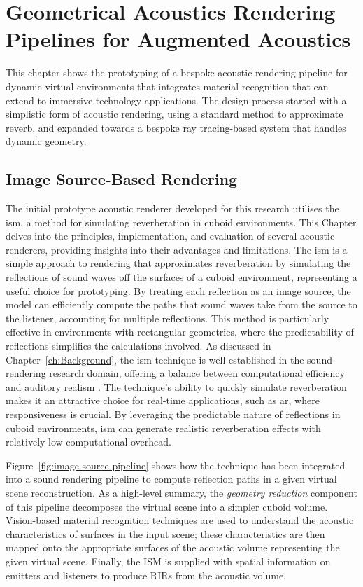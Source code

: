 \chapter{Geometrical Acoustics Rendering Pipelines for Augmented Acoustics}\label{ch:acousticrendering} %

This chapter shows the prototyping of a bespoke acoustic rendering pipeline for dynamic virtual environments that integrates material recognition that can extend to immersive technology applications. The design process started with a simplistic form of acoustic rendering, using a standard method to approximate reverb, and expanded towards a bespoke ray tracing-based system that handles dynamic geometry.

\section{Image Source-Based Rendering}
The initial prototype acoustic renderer developed for this research utilises the \acrfull{ism}, a method for simulating reverberation in cuboid environments. This Chapter delves into the principles, implementation, and evaluation of several acoustic renderers, providing insights into their advantages and limitations. The \acrshort{ism} is a simple approach to rendering that approximates reverberation by simulating the reflections of sound waves off the surfaces of a cuboid environment, representing a useful choice for prototyping. By treating each reflection as an image source, the model can efficiently compute the paths that sound waves take from the source to the listener, accounting for multiple reflections. This method is particularly effective in environments with rectangular geometries, where the predictability of reflections simplifies the calculations involved. As discussed in Chapter~\ref{ch:Background}, the \acrshort{ism} technique is well-established in the sound rendering research domain, offering a balance between computational efficiency and auditory realism  \citep{savioja1999creating, allen1979image}. The technique's ability to quickly simulate reverberation makes it an attractive choice for real-time applications, such as \acrshort{ar}, where responsiveness is crucial. By leveraging the predictable nature of reflections in cuboid environments, \acrshort{ism} can generate realistic reverberation effects with relatively low computational overhead.\par
Figure~\ref{fig:image-source-pipeline} shows how the technique has been integrated into a sound rendering pipeline to compute reflection paths in a given virtual scene reconstruction. As a high-level summary, the \emph{geometry reduction} component of this pipeline decomposes the virtual scene into a simpler cuboid volume. Vision-based material recognition techniques are used to understand the acoustic characteristics of surfaces in the input scene; these characteristics are then mapped onto the appropriate surfaces of the acoustic volume representing the given virtual scene. Finally, the ISM is supplied with spatial information on emitters and listeners to produce RIRs from the acoustic volume.\par

